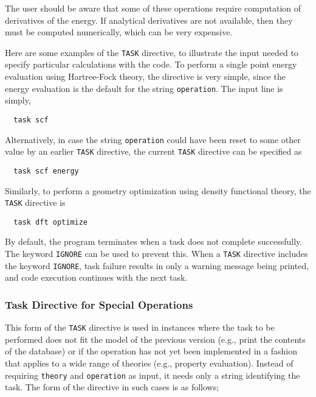 The user should be aware that some of these operations require
computation of derivatives of the energy.
If analytical derivatives are not available, then they must be
computed numerically, which can be very expensive.

Here are some examples of the \verb+TASK+ directive, to illustrate
the input needed to specify particular calculations with the code.  
To perform a single point energy evaluation using Hartree-Fock theory,
the directive is very simple, since the energy evaluation is the default
for the string \verb+operation+.  The input line is simply,

\begin{verbatim}
  task scf
\end{verbatim}

Alternatively, in case the string \verb+operation+ could have
been reset to some other value by an earlier \verb+TASK+ directive, the
current \verb+TASK+ directive can be specified as

\begin{verbatim}
  task scf energy
\end{verbatim}

Similarly, to perform a geometry optimization using density functional
theory, the \verb+TASK+ directive is

\begin{verbatim}
  task dft optimize
\end{verbatim}


By default, the program terminates when a task does not complete 
successfully.  The keyword \verb+IGNORE+ can be used to prevent this.
When a \verb+TASK+ directive includes the keyword \verb+IGNORE+, 
task failure results in only a warning message being printed, and 
code execution continues with the next task.

\subsubsection{Task Directive for Special Operations}

This form of the \verb+TASK+ directive is used in instances where 
the task to be performed does not fit the model of the previous 
version (e.g., print the contents of the
database) or if the operation has not yet been implemented in a
fashion that applies to a wide range of theories (e.g., property
evaluation).  Instead of requiring \verb+theory+ and \verb+operation+
as input, it needs only a string identifying the task.  The form of the
directive in such cases is as follows;

